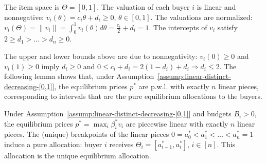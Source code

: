 \begin{assumption}
	The item space is $\Theta = [0,1]$. 
	The valuation of each buyer $i$ is linear and nonnegative: 
	$v_i(\theta) = c_i \theta + d_i \geq 0, \, \theta\in [0,1]$.
	The valuations are normalized:
	$v_i(\Theta) = \|v_i\| = \int_0^1 v_i(\theta) d\theta = \frac{c_i}{2} + d_i = 1$.
	The intercepts of $v_i$ satisfy
	$2 \geq d_1 > \dots > d_n \geq 0$.
	\label{assump:linear-distinct-decreasing-[0,1]}
\end{assumption}
The upper and lower bounds above are due to nonnegativity: $v_i(0) \geq 0$ and $v_i(1) \geq 0$ imply $d_i \geq 0$ and $0 \leq c_i + d_i = 2(1-d_i) + d_i \Rightarrow d_i \leq 2$. The following lemma shows that, under Assumption~\ref{assump:linear-distinct-decreasing-[0,1]}, the equilibrium prices $p^*$ are p.w.l. with exactly $n$ linear pieces, corresponding to intervals that are the pure equilibrium allocations to the buyers.
\begin{lemma}
	Under Assumption~\ref{assump:linear-distinct-decreasing-[0,1]} and budgets $B_i > 0$, the equilibrium prices $p^* = \max_i \beta^*_i v_i$ are piecewise linear with exactly $n$ linear pieces.
	The (unique) breakpoints of the linear pieces $0 = a^*_0 < a^*_1 < \dots < a^*_n = 1$ induce a pure allocation: buyer $i$ receives $\Theta_i = [a^*_{i-1}, a^*_i]$, $i\in [n]$. This allocation is the unique equilibrium allocation.
	\label{lemma:all-linear-equilibrium-geometry}
\end{lemma}	
